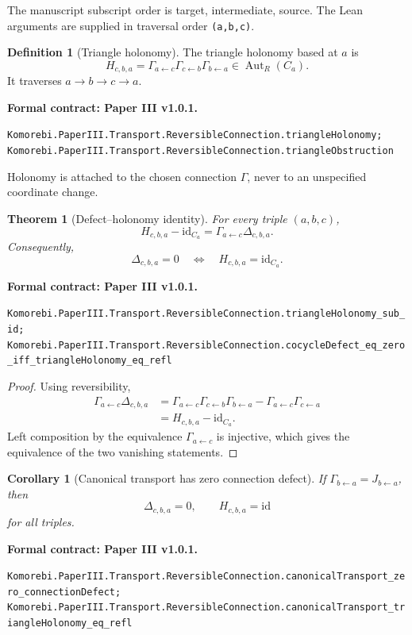 \documentclass[11pt,a4paper]{article}
\newtheorem{theorem}{Theorem}[section]
\theoremstyle{plain}
\newtheorem{corollary}[corollary]{Corollary}
\theoremstyle{definition}
\newtheorem{definition}[definition]{Definition}
\theoremstyle{remark}
\newcommand{\id}{\mathrm{id}}
\newcommand{\leanname}[1]{\nolinkurl{#1}}
\newcommand{\statusleanthree}[1]{\par\smallskip\noindent\begin{minipage}{\linewidth}{\color{leanblue}\textbf{Formal contract: Paper III v1.0.1.}}\par\begingroup\small\raggedright\leanname{#1}\par\endgroup\end{minipage}\par\smallskip}
\begin{document}
The manuscript subscript order is target, intermediate, source.  The Lean
arguments are supplied in traversal order \leanname{(a,b,c)}.

\begin{definition}[Triangle holonomy]
\label{def:triangle-holonomy}
The triangle holonomy based at $a$ is
\[
H_{c,b,a}
=
\Gamma_{a\leftarrow c}
\Gamma_{c\leftarrow b}
\Gamma_{b\leftarrow a}
\in\operatorname{Aut}_R(C_a).
\]
It traverses $a\to b\to c\to a$.
\end{definition}
\statusleanthree{Komorebi.PaperIII.Transport.ReversibleConnection.triangleHolonomy; Komorebi.PaperIII.Transport.ReversibleConnection.triangleObstruction}

Holonomy is attached to the chosen connection $\Gamma$, never to an
unspecified coordinate change.

\begin{theorem}[Defect--holonomy identity]
\label{thm:defect-holonomy}
For every triple $(a,b,c)$,
\[
\boxed{
H_{c,b,a}-\id_{C_a}
=
\Gamma_{a\leftarrow c}\Delta_{c,b,a}.
}
\]
Consequently,
\[
\Delta_{c,b,a}=0
\quad\Longleftrightarrow\quad
H_{c,b,a}=\id_{C_a}.
\]
\end{theorem}
\statusleanthree{Komorebi.PaperIII.Transport.ReversibleConnection.triangleHolonomy_sub_id; Komorebi.PaperIII.Transport.ReversibleConnection.cocycleDefect_eq_zero_iff_triangleHolonomy_eq_refl}

\begin{proof}
Using reversibility,
\[
\begin{aligned}
\Gamma_{a\leftarrow c}\Delta_{c,b,a}
&=
\Gamma_{a\leftarrow c}
\Gamma_{c\leftarrow b}
\Gamma_{b\leftarrow a}
-
\Gamma_{a\leftarrow c}\Gamma_{c\leftarrow a}\\
&=H_{c,b,a}-\id_{C_a}.
\end{aligned}
\]
Left composition by the equivalence $\Gamma_{a\leftarrow c}$ is injective,
which gives the equivalence of the two vanishing statements.
\end{proof}

\begin{corollary}[Canonical transport has zero connection defect]
\label{cor:canonical-zero-defect}
If $\Gamma_{b\leftarrow a}=J_{b\leftarrow a}$, then
\[
\Delta_{c,b,a}=0,
\qquad
H_{c,b,a}=\id
\]
for all triples.
\end{corollary}
\statusleanthree{Komorebi.PaperIII.Transport.ReversibleConnection.canonicalTransport_zero_connectionDefect; Komorebi.PaperIII.Transport.ReversibleConnection.canonicalTransport_triangleHolonomy_eq_refl}
\end{document}
